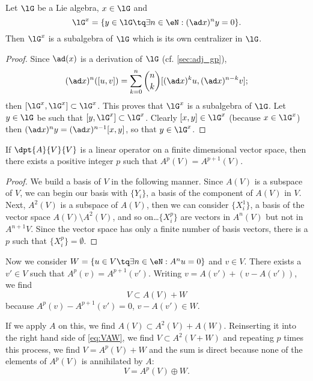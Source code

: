 \begin{proposition}\label{prop:G_x_central}
    Let $\lG$ be a Lie algebra, $x\in\lG$ and
        \begin{equation}
            \lG^x=\{y\in\lG\tq\exists n\in\eN:(\ad x)^ny=0\}.
        \end{equation}
    Then $\lG^x$ is a subalgebra of $\lG$ which is its own centralizer in $\lG$.
\end{proposition}

\begin{proof}
Since $\ad(x)$ is a derivation of $\lG$ (cf. \ref{sec:adj_gp}),
\[
(\ad x)^n([u,v])=\sum_{k=0}^n \binom{n}{k} [ (\ad x)^ku,(\ad x)^{n-k}v ];
\]
then $[\lG^x,\lG^x]\subset\lG^x$. This proves that $\lG^x$ is a subalgebra of $\lG$. Let $y\in\lG$ be such that $[y,\lG^x]\subset\lG^x$. Clearly $[x,y]\in\lG^x$ (because $x\in\lG^x$) then $(\ad x)^ny=(\ad x)^{n-1}[x,y]$, so that $y\in\lG^x$.
\end{proof}

\begin{lemma}
If $\dpt{A}{V}{V}$ is a linear operator on a finite dimensional vector space, then there exists a positive integer $p$ such that $A^p(V)=A^{p+1}(V)$.
\label{lem:A_n_stabilise}
\end{lemma}

\begin{proof}
We build a basis of $V$ in the following manner. Since $A(V)$ is a subspace of $V$, we can begin our basis with $\{Y_i\}$, a basis of the component of $A(V)$ in $V$. Next, $A^2(V)$ is a subspace of $A(V)$, then we can consider $\{X^1_i\}$, a basis of the vector space $A(V)\setminus A^2(V)$, and so on\ldots $\{X^p_i\}$ are vectors in $A^n(V)$ but not in $A^{n+1}V$. Since the vector space has only a finite number of basis vectors, there is a $p$ such that $\{X^p_i\}=\emptyset$.
\end{proof}

Now we consider $W=\{u\in V\tq\exists n\in\eN:A^nu=0\}$ and $v\in V$. There exists a $v'\in V$ such that $A^p(v)=A^{p+1}(v')$. Writing  $v= A(v')+(v-A(v'))$, we find
\begin{equation}\label{eq:VAW}
V\subset A(V)+W
\end{equation}
because $A^p(v)-A^{p+1}(v')=0$, $v-A(v')\in W$.


If we apply $A$ on this, we find $A(V)\subset A^2(V)+A(W)$. Reinserting it into the right hand side of \eqref{eq:VAW}, we find $V\subset A^2(V+W)$ and repeating $p$ times this process, we find $V=A^p(V)+W$ and the sum is direct because none of the elements of $A^p(V)$ is annihilated by $A$:
\begin{equation}\label{eq:ApoplusW}
V=A^p(V)\oplus W.
\end{equation}

